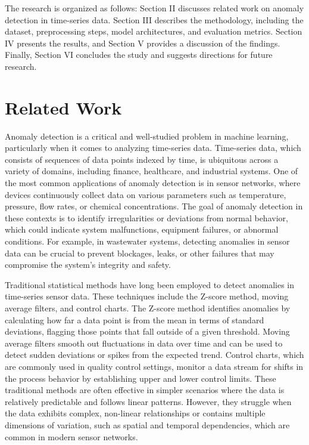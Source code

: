 \documentclass[conference]{IEEEtran}
\begin{document}
The research is organized as follows: Section II discusses related work on anomaly detection in time-series data. Section III describes the methodology, including the dataset, preprocessing steps, model architectures, and evaluation metrics. Section IV presents the results, and Section V provides a discussion of the findings. Finally, Section VI concludes the study and suggests directions for future research.

\section{Related Work}
\label{sec:related}
Anomaly detection is a critical and well-studied problem in machine learning, particularly when it comes to analyzing time-series data. Time-series data, which consists of sequences of data points indexed by time, is ubiquitous across a variety of domains, including finance, healthcare, and industrial systems. One of the most common applications of anomaly detection is in sensor networks, where devices continuously collect data on various parameters such as temperature, pressure, flow rates, or chemical concentrations. The goal of anomaly detection in these contexts is to identify irregularities or deviations from normal behavior, which could indicate system malfunctions, equipment failures, or abnormal conditions. For example, in wastewater systems, detecting anomalies in sensor data can be crucial to prevent blockages, leaks, or other failures that may compromise the system’s integrity and safety.

Traditional statistical methods have long been employed to detect anomalies in time-series sensor data. These techniques include the Z-score method, moving average filters, and control charts. The Z-score method identifies anomalies by calculating how far a data point is from the mean in terms of standard deviations, flagging those points that fall outside of a given threshold. Moving average filters smooth out fluctuations in data over time and can be used to detect sudden deviations or spikes from the expected trend. Control charts, which are commonly used in quality control settings, monitor a data stream for shifts in the process behavior by establishing upper and lower control limits. These traditional methods are often effective in simpler scenarios where the data is relatively predictable and follows linear patterns. However, they struggle when the data exhibits complex, non-linear relationships or contains multiple dimensions of variation, such as spatial and temporal dependencies, which are common in modern sensor networks.
\end{document}
